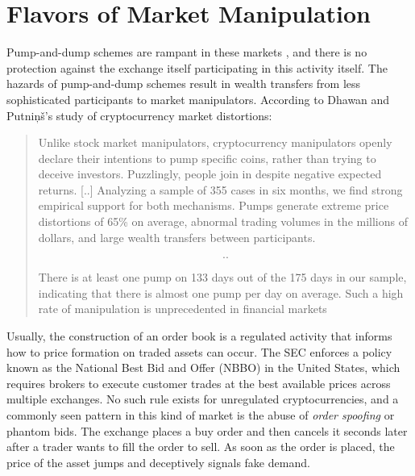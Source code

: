 \section{Flavors of Market Manipulation}


Pump-and-dump schemes are rampant in these markets \cite{shifflett_traders_2018,
hamrick_economics_2018, hamrick_examination_2018, xu_anatomy_2019,
li_cryptocurrency_2019, livni_dramatic_2021, kamps_moon_2018}, and there is no
protection against the exchange itself participating in this activity itself.
The hazards of pump-and-dump schemes result in wealth transfers from less
sophisticated participants to market manipulators. According to Dhawan and
Putniņš's study \cite{dhawan_new_2020} of cryptocurrency market distortions:

\begin{quote}
Unlike stock market manipulators, cryptocurrency manipulators openly declare
their intentions to pump specific coins, rather than trying to deceive
investors. Puzzlingly, people join in despite negative expected returns.
[..] Analyzing a sample of 355 cases in six months, we find strong empirical
support for both mechanisms. Pumps generate extreme price distortions of 65\%
on average, abnormal trading volumes in the millions of dollars, and large
wealth transfers between participants.

\[..\]

There is at least one pump on 133 days out of the 175 days in our
sample, indicating that there is almost one pump per day on average.
Such a high rate of manipulation is unprecedented in financial markets
\end{quote}

Usually, the construction of an order book is a regulated activity that informs
how to price formation on traded assets can occur. The SEC enforces a policy
known as the National Best Bid and Offer (NBBO) in the United States, which
requires brokers to execute customer trades at the best available prices across
multiple exchanges. No such rule exists for unregulated cryptocurrencies, and a
commonly seen pattern in this kind of market is the abuse of \textit{order
spoofing} or phantom bids. The exchange places a buy order and then cancels it
seconds later after a trader wants to fill the order to sell. As soon as the
order is placed, the price of the asset jumps and deceptively signals fake
demand.
\cite{cong_crypto_2020}



